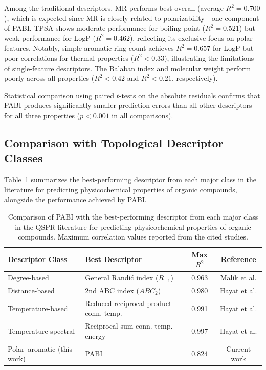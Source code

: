 \documentclass[12pt,a4paper]{article}
\begin{document}
Among the traditional descriptors, MR performs best overall (average $R^2 = 0.700$), which is expected since MR is closely related to polarizability---one component of PABI. TPSA shows moderate performance for boiling point ($R^2 = 0.521$) but weak performance for LogP ($R^2 = 0.462$), reflecting its exclusive focus on polar features. Notably, simple aromatic ring count achieves $R^2 = 0.657$ for LogP but poor correlations for thermal properties ($R^2 < 0.33$), illustrating the limitations of single-feature descriptors. The Balaban index and molecular weight perform poorly across all properties ($R^2 < 0.42$ and $R^2 < 0.21$, respectively).

Statistical comparison using paired $t$-tests on the absolute residuals confirms that PABI produces significantly smaller prediction errors than all other descriptors for all three properties ($p < 0.001$ in all comparisons).

\subsection{Comparison with Topological Descriptor Classes}

Table~\ref{tab:descriptor_classes} summarizes the best-performing descriptor from each major class in the literature for predicting physicochemical properties of organic compounds, alongside the performance achieved by PABI.

\begin{table}[H]
\centering
\caption{Comparison of PABI with the best-performing descriptor from each major class in the QSPR literature for predicting physicochemical properties of organic compounds. Maximum correlation values reported from the cited studies.}
\label{tab:descriptor_classes}
\begin{tabular}{@{}llcc@{}}
\toprule
\textbf{Descriptor Class} & \textbf{Best Descriptor} & \textbf{Max $R^2$} & \textbf{Reference} \\
\midrule
Degree-based & General Randi\'{c} index ($R_{-1}$) & 0.963 & Malik et al.\cite{malik2022correlation} \\
Distance-based & 2nd ABC index ($ABC_2$) & 0.980 & Hayat et al.\cite{hayat2020quality} \\
Temperature-based & Reduced reciprocal product-conn. temp. & 0.991 & Hayat et al.\cite{hayat2024novel} \\
Temperature-spectral & Reciprocal sum-conn. temp. energy & 0.997 & Hayat et al.\cite{hayat2026novel} \\
Polar--aromatic (this work) & PABI & 0.824 & Current work \\
\bottomrule
\end{tabular}
\end{table}
\end{document}
